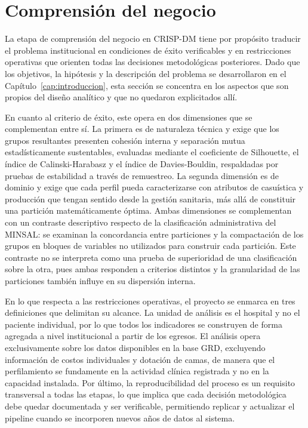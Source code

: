 \section{Comprensión del negocio}
\label{sec:comprension-negocio}

La etapa de comprensión del negocio en CRISP-DM tiene por propósito traducir
el problema institucional en condiciones de éxito verificables y en restricciones
operativas que orienten todas las decisiones metodológicas posteriores. Dado que
los objetivos, la hipótesis y la descripción del problema se desarrollaron en el
Capítulo~\ref{cap:introduccion}, esta sección se concentra en los aspectos que
son propios del diseño analítico y que no quedaron explicitados allí.

En cuanto al criterio de éxito, este opera en dos dimensiones que se
complementan entre sí. La primera es de naturaleza técnica y exige que los grupos
resultantes presenten cohesión interna y separación mutua estadísticamente
sustentables, evaluadas mediante el coeficiente de Silhouette, el índice de
Calinski-Harabasz y el índice de Davies-Bouldin, respaldadas por pruebas de
estabilidad a través de remuestreo. La segunda dimensión es de dominio y exige
que cada perfil pueda caracterizarse con atributos de casuística y producción que
tengan sentido desde la gestión sanitaria, más allá de constituir una partición
matemáticamente óptima. Ambas dimensiones se complementan con un contraste descriptivo respecto de la
clasificación administrativa del MINSAL: se examinan la concordancia entre
particiones y la compactación de los grupos en bloques de variables no utilizados
para construir cada partición. Este contraste no se interpreta como una prueba de
superioridad de una clasificación sobre la otra, pues ambas responden a criterios
distintos y la granularidad de las particiones también influye en su dispersión
interna.

En lo que respecta a las restricciones operativas, el proyecto se enmarca en
tres definiciones que delimitan su alcance. La unidad de análisis es el hospital
y no el paciente individual, por lo que todos los indicadores se construyen de
forma agregada a nivel institucional a partir de los egresos. El análisis opera
exclusivamente sobre los datos disponibles en la base GRD, excluyendo información
de costos individuales y dotación de camas, de manera que el perfilamiento se
fundamente en la actividad clínica registrada y no en la capacidad instalada.
Por último, la reproducibilidad del proceso es un requisito transversal a todas
las etapas, lo que implica que cada decisión metodológica debe quedar documentada
y ser verificable, permitiendo replicar y actualizar el pipeline cuando se
incorporen nuevos años de datos al sistema.

